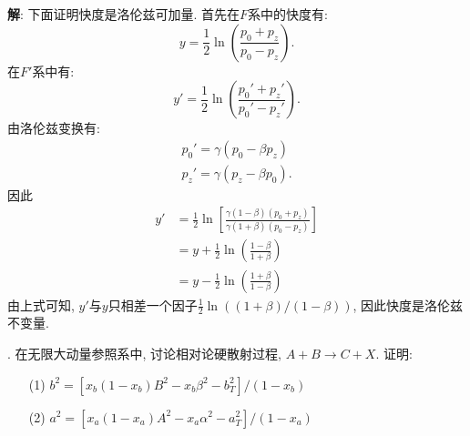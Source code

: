 \documentclass{ctexart}
\newcounter{mycnt}
\newenvironment{problem}{\noindent \stepcounter{mycnt}\themycnt.}{

}
\newenvironment{answer}{\textbf{解}:}{
\vspace{0.5cm}
}
\begin{document}
\begin{answer}
下面证明快度是洛伦兹可加量. 首先在$F$系中的快度有:
\begin{equation}
  y = \frac{1}{2} \ln \left( \frac{p_0 + p_z}{p_0 - p_z}\right).
\end{equation}
在$F'$系中有:
\begin{equation}
  y' = \frac{1}{2} \ln \left( \frac{p_0' + p_z'}{p_0' - p_z'}\right).
\end{equation}
由洛伦兹变换有:
\begin{gather}
  p_0' = \gamma (p_0 - \beta p_z) \\
  p_z' = \gamma (p_z - \beta p_0).
\end{gather}
因此
\begin{equation}
  \begin{split}
    y' &= \frac{1}{2} \ln \left[ \frac{\gamma(1-\beta)(p_0 + p_z)}{\gamma(1+\beta)(p_0 - p_z)} \right] \\
    &= y + \frac{1}{2} \ln \left( \frac{1-\beta}{1+\beta} \right) \\
    &= y - \frac{1}{2} \ln \left( \frac{1+\beta}{1-\beta} \right)
  \end{split}
\end{equation}
由上式可知, $y'$与$y$只相差一个因子$\frac{1}{2}\ln((1+\beta)/(1-\beta))$, 因此快度是洛伦兹不变量.

\end{answer}

\begin{problem}
  在无限大动量参照系中, 讨论相对论硬散射过程, $A + B \rightarrow C + X$. 证明:
  \begin{enumerate}
  \item[(1)] $b^2 = [x_b(1-x_b)B^2 - x_b \beta^2 - b_T^2]/(1 - x_b)$
  \item[(2)] $a^2 = [x_a(1-x_a)A^2 - x_a \alpha^2 - a_T^2]/(1 - x_a)$
  \end{enumerate}
\end{problem}
\end{document}
